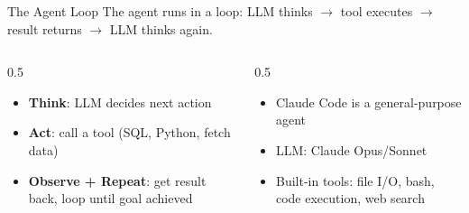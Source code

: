 \documentclass[aspectratio=169]{beamer}
\begin{document}
\begin{frame}{The Agent Loop}
The agent runs in a loop: LLM thinks $\rightarrow$ tool executes $\rightarrow$ result returns $\rightarrow$ LLM thinks again.
\vspace{0.3cm}
\begin{columns}[T]
\begin{column}{0.5\textwidth}
\begin{itemize}\small
  \item \textbf{Think}: LLM decides next action
  \item \textbf{Act}: call a tool (SQL, Python, fetch data)
  \item \textbf{Observe + Repeat}: get result back, loop until goal achieved
\end{itemize}
\end{column}
\begin{column}{0.5\textwidth}
\begin{shadedbox}[title=\textbf{This is exactly what Claude Code does}]
\begin{itemize}\small
  \item Claude Code is a general-purpose agent
  \item LLM: Claude Opus/Sonnet
  \item Built-in tools: file I/O, bash, code execution, web search
\end{itemize}
\end{shadedbox}
\end{column}
\end{columns}
\end{frame}
\end{document}
